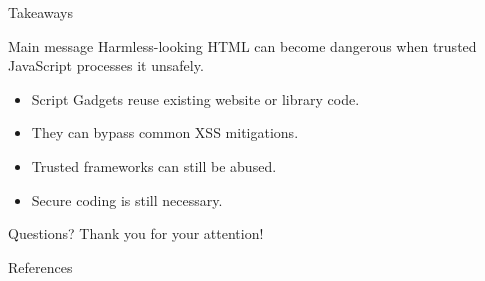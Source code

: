\documentclass[%
font=nexus,
aspectratio=169,
language=english
]{tubsCD/tubscd}
\begin{document}
\begin{frame}{Takeaways}
\begin{alertblock}{Main message}
Harmless-looking HTML can become dangerous when trusted JavaScript processes it unsafely.
\end{alertblock}

\vspace{0.7em}

\begin{itemize}
\item Script Gadgets reuse existing website or library code.
\item They can bypass common XSS mitigations.
\item Trusted frameworks can still be abused.
\item Secure coding is still necessary.
\end{itemize}
\end{frame}

\begin{frame}{Questions?}
\centering
\Large Thank you for your attention!
\end{frame}

\begin{frame}[allowframebreaks]{References}


\end{frame}
\end{document}
